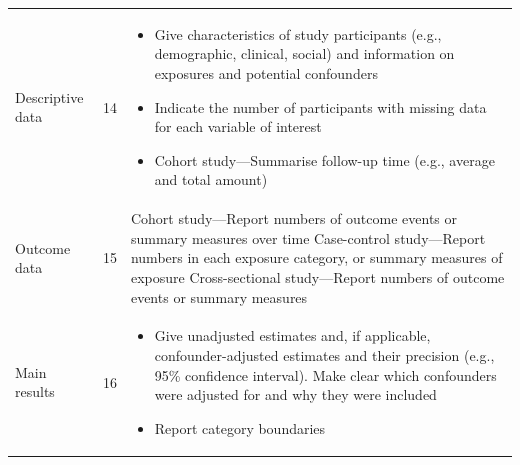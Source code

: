 \documentclass[]{book}
\providecommand{\tightlist}{%
  \setlength{\itemsep}{0pt}\setlength{\parskip}{0pt}}
\begin{document}
\begin{longtable}[]{@{}lll@{}}
\begin{minipage}[t]{0.34\columnwidth}\raggedright
Descriptive data\strut
\end{minipage} & \begin{minipage}[t]{0.17\columnwidth}\raggedright
14\strut
\end{minipage} & \begin{minipage}[t]{0.40\columnwidth}\raggedright
\begin{itemize}
\tightlist
\item
  Give characteristics of
  study participants (e.g.,
  demographic, clinical, social)
  and information on exposures
  and potential confounders
\item
  Indicate the number of
  participants with missing data
  for each variable of interest
\item
  Cohort study---Summarise
  follow-up time (e.g., average
  and total amount)
\end{itemize}\strut
\end{minipage}\tabularnewline
\begin{minipage}[t]{0.34\columnwidth}\raggedright
Outcome data\strut
\end{minipage} & \begin{minipage}[t]{0.17\columnwidth}\raggedright
15\strut
\end{minipage} & \begin{minipage}[t]{0.40\columnwidth}\raggedright
Cohort study---Report numbers of
outcome events or summary
measures over time
Case-control study---Report
numbers in each exposure
category, or summary measures
of exposure
Cross-sectional study---Report
numbers of outcome events or
summary measures\strut
\end{minipage}\tabularnewline
\begin{minipage}[t]{0.34\columnwidth}\raggedright
Main results\strut
\end{minipage} & \begin{minipage}[t]{0.17\columnwidth}\raggedright
16\strut
\end{minipage} & \begin{minipage}[t]{0.40\columnwidth}\raggedright
\begin{itemize}
\tightlist
\item
  Give unadjusted estimates
  and, if applicable,
  confounder-adjusted estimates
  and their precision (e.g., 95\%
  confidence interval).
  Make clear which confounders
  were adjusted for and why they
  were included
\item
  Report category boundaries

\end{itemize}
\end{minipage}
\end{longtable}
\end{document}
